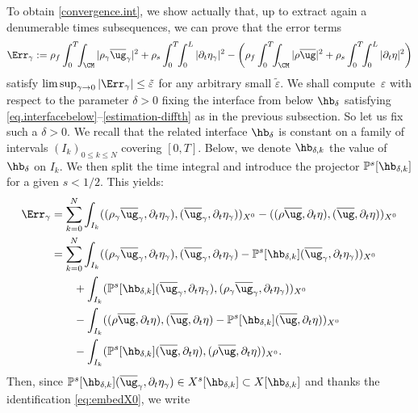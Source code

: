 To obtain \eqref{convergence.int}, we show actually that, up to extract again a denumerable times subsequences, we can prove that the error terms
\[
\Err_{\gamma} := \rho_{f}\int_{0}^{T}\!\!\int_{\CM}\vert \rho_{\gamma}\overline{\ug}_{\gamma}\vert^{2}+\rho_{s}\int_{0}^{T}\!\!\int_{0}^{L}\vert\partial_{t}\eta_{\gamma}\vert^{2}
- \biggl( \rho_{f}\int_{0}^{T}\!\!\int_{\CM}\vert \rho\overline{\ug}\vert^{2}+\rho_{s}\int_{0}^{T}\!\!\int_{0}^{L}\vert\partial_{t}\eta\vert^{2} \biggr)
\]
satisfy $\limsup_{\gamma \to 0} |\Err_{\gamma}| \leq \tilde\varepsilon$ for any arbitrary small $\tilde\varepsilon$. We shall compute~$\varepsilon$ with respect to the parameter $\delta >0$ fixing the interface from below $\hb_{\delta}$ satisfying
\eqref{eq.interfacebelow}--\eqref{estimation-diffth} as in the previous subsection. So let us fix such a $\delta >0$.
We recall that the related interface $\hb_{\delta}$
is constant on a family of intervals $(I_k)_{0 \leq k \leq N}$ covering $[0,T]$. Below, we denote $\hb_{\delta,k}$ the value
of $\hb_{\delta}$ on $I_k$. We then split the time integral and introduce the projector $\mathbb P^s[\hb_{\delta,k}]$
for a given $s < 1/2$. This yields:
\begin{align*}
\Err_{\gamma} & = \sum_{k=0}^N \int_{I_{k}} ( (\rho_{\gamma} \overline{\ug}_{\gamma},\partial_t \eta_{\gamma}),( \overline{\ug}_{\gamma},\partial_t \eta_{\gamma}))_{X^0} - ( (\rho \overline{\ug},\partial_t \eta),( \overline{\ug},\partial_t \eta))_{X^0} \\
& = \sum_{k=0}^N \int_{I_{k}} ( (\rho_{\gamma} \overline{\ug}_{\gamma},\partial_t\eta_{\gamma}),( \overline{\ug}_{\gamma},\partial_t \eta_{\gamma})- \mathbb{P}^{s}[\hb_{\delta, k}](\overline{\ug}_{\gamma},\partial_{t}\eta_{\gamma}))_{X^0} \\
& \qquad + \int_{I_{k}} ( \mathbb{P}^{s}[\hb_{\delta, k}](\overline{\ug}_{\gamma},\partial_{t}\eta_{\gamma}),(\rho_{\gamma} \overline{\ug}_{\gamma},\partial_t \eta_{\gamma}))_{X^0} \\
& \qquad - \int_{I_{k}} ( (\rho \overline{\ug},\partial_t \eta),( \overline{\ug},\partial_t \eta)- \mathbb{P}^{s}[\hb_{\delta, k}](\overline{\ug},\partial_{t}\eta))_{X^0} \\
& \qquad - \int_{I_{k}} ( \mathbb{P}^{s}[\hb_{\delta, k}](\overline{\ug},\partial_{t}\eta),(\rho \overline{\ug},\partial_t \eta))_{X^0}.
\end{align*}
Then, since $\mathbb P^s[\hb_{\delta,k}](\overline{\ug}_\gamma,\partial_t \eta_\gamma) \in X^s[\hb_{\delta,k}]\subset X[\hb_{\delta,k}] $ and thanks the identification \eqref{eq:embedX0}, we write
